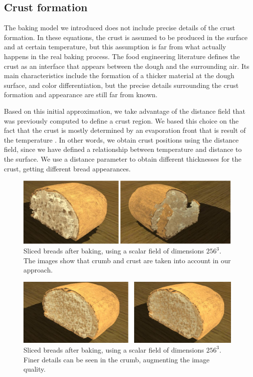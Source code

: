 \documentclass[spanish,a4paper,11pt,oneside,links]{report}
\begin{document}
\subsection{Crust formation}

The baking model we introduced does not include precise details of the crust formation. 
In these equations, the crust is assumed to be produced in the surface and at certain temperature, but this assumption is far from what actually happens in the real baking process. 
The food engineering literature defines the crust as an interface that appears between the dough and the surrounding air.
Its main characteristics include the formation of a thicker material at the dough surface, and color differentiation, but the precise details surrounding the crust formation and appearance are still far from known.

Based on this initial approximation, we take advantage of the distance field that was previously computed to define a crust region.
We based this choice on the fact that the crust is mostly determined by an evaporation front that is result of the temperature \cite{Jefferson2007}. 
In other words, we obtain crust positions using the distance field, since we have defined a relationship between temperature and distance to the surface.
We use a distance parameter to obtain different thicknesses for the crust, getting different bread appearances.

\begin{figure}[!ht]
\begin{center}
\includegraphics[width=19cm]{figures/otherbread}
\caption{Sliced breads after baking, using a scalar field of dimensions $256^{3}$. The images show that crumb and crust are taken into account in our approach.}
\label{fg:renders}
\end{center}
\end{figure}

\begin{figure}[!ht]
\begin{center}
\includegraphics[width=19cm]{figures/otherbread512}
\caption{Sliced breads after baking, using a scalar field of dimensions $256^{3}$. Finer details can be seen in the crumb, augmenting the image quality.}
\label{fg:renders2}
\end{center}
\end{figure}
\end{document}
